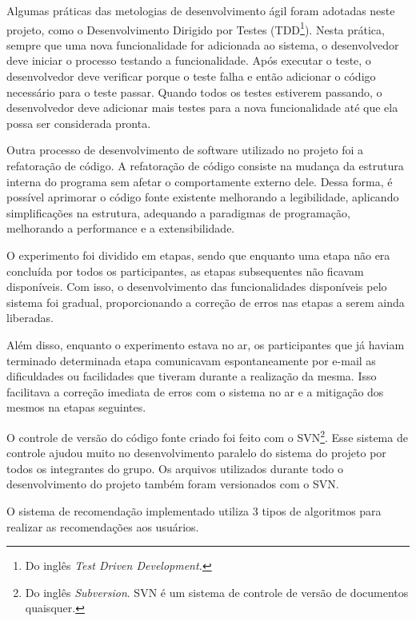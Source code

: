  Algumas práticas das metologias de desenvolvimento ágil foram adotadas neste projeto, como o Desenvolvimento Dirigido por Testes (TDD\footnote{Do inglês \textit{Test Driven Development.}}). Nesta prática, sempre que uma nova funcionalidade for adicionada ao sistema, o desenvolvedor deve iniciar o processo testando a funcionalidade. Após executar o teste, o desenvolvedor deve verificar porque o teste falha e então adicionar o código necessário para o teste passar. Quando todos os testes estiverem passando, o desenvolvedor deve adicionar mais testes para a nova funcionalidade até que ela possa ser considerada pronta.
 
 Outra processo de desenvolvimento de software utilizado no projeto foi a refatoração de código\cite{fowler1999refactoring}. A refatoração de código consiste na mudança da estrutura interna do programa sem afetar o comportamente externo dele. Dessa forma, é possível aprimorar o código fonte existente melhorando a legibilidade, aplicando simplificações na estrutura, adequando a paradigmas de programação, melhorando a performance e a extensibilidade.

 O experimento foi dividido em etapas, sendo que enquanto uma etapa não era concluída por todos os participantes, as etapas subsequentes não ficavam disponíveis. Com isso, o desenvolvimento das funcionalidades disponíveis pelo sistema foi gradual, proporcionando a correção de erros nas etapas a serem ainda liberadas.

 Além disso, enquanto o experimento estava no ar, os participantes que já haviam terminado determinada etapa comunicavam espontaneamente por e-mail as dificuldades ou facilidades que tiveram durante a realização da mesma. Isso facilitava a correção imediata de erros com o sistema no ar e a mitigação dos mesmos na etapas seguintes.

 O controle de versão do código fonte criado foi feito com o SVN\footnote{Do inglês \textit{Subversion}. SVN é um sistema de controle de versão de documentos quaisquer.}. Esse sistema de controle ajudou muito no desenvolvimento paralelo do sistema do projeto por todos os integrantes do grupo. Os arquivos utilizados durante todo o desenvolvimento do projeto também foram versionados com o SVN.

 O sistema de recomendação implementado utiliza 3 tipos de algoritmos para realizar as recomendações aos usuários.

